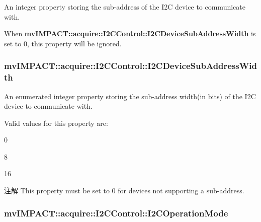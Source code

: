 An integer property storing the sub-\/address of the I2\+C device to communicate with. 

When {\bfseries \hyperlink{classmv_i_m_p_a_c_t_1_1acquire_1_1_i2_c_control_a7e555a00afae7ba4008c20ef23586cd3}{mv\+I\+M\+P\+A\+C\+T\+::acquire\+::\+I2\+C\+Control\+::\+I2\+C\+Device\+Sub\+Address\+Width}} is set to 0, this property will be ignored. \hypertarget{classmv_i_m_p_a_c_t_1_1acquire_1_1_i2_c_control_a7e555a00afae7ba4008c20ef23586cd3}{
\subsubsection[{I2\+C\+Device\+Sub\+Address\+Width}]{ mv\+I\+M\+P\+A\+C\+T\+::acquire\+::\+I2\+C\+Control\+::\+I2\+C\+Device\+Sub\+Address\+Width}}\label{classmv_i_m_p_a_c_t_1_1acquire_1_1_i2_c_control_a7e555a00afae7ba4008c20ef23586cd3}


An enumerated integer property storing the sub-\/address width(in bits) of the I2\+C device to communicate with. 

Valid values for this property are\+:


\begin{DoxyItemize}
\item 0
\item 8
\item 16
\end{DoxyItemize}

\begin{DoxyNote}{注解}
This property must be set to 0 for devices not supporting a sub-\/address. 
\end{DoxyNote}
\hypertarget{classmv_i_m_p_a_c_t_1_1acquire_1_1_i2_c_control_a748f6467d536445c1cfef03dbe74104c}{
\subsubsection[{I2\+C\+Operation\+Mode}]{ mv\+I\+M\+P\+A\+C\+T\+::acquire\+::\+I2\+C\+Control\+::\+I2\+C\+Operation\+Mode}}\label{classmv_i_m_p_a_c_t_1_1acquire_1_1_i2_c_control_a748f6467d536445c1cfef03dbe74104c}


